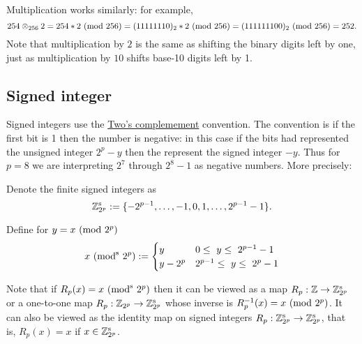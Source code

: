 \begin{example} Multiplication works similarly: for example,
\[
254 \ensuremath{\otimes}_{256} 2 = 254 * 2 \ ({\rm mod}\ 256) = (11111110)_2 * 2  \ ({\rm mod}\ 256)
= (111111100)_2  \ ({\rm mod}\ 256) = 252.
\]
Note that multiplication by $2$ is the same as shifting the binary digits left by one, just as multiplication by $10$ shifts base-10 digits left by 1. \end{example}

\subsection{Signed integer}
Signed integers use the \href{https://epubs.siam.org/doi/abs/10.1137/1.9780898718072.ch3}{Two's complemement} convention. The convention is if the first bit is 1 then the number is negative: in this case if the bits had represented the unsigned integer $2^p - y$ then the represent the signed integer $-y$. Thus for $p = 8$ we are interpreting $2^7$ through $2^8-1$ as negative numbers. More precisely:

\begin{definition} Denote the finite signed integers as
\[
{\mathbb Z}_{2^p}^{\rm s} := \{-2^{p-1} ,\ldots, -1 ,0,1, \ldots, 2^{p-1}-1\}.
\]
\end{definition}

\begin{definition} Define for $y = x\ ({\rm mod}\ 2^p)$
\[
x\ ({\rm mod}^{\rm s}\ 2^p) := \begin{cases} y & 0 \ensuremath{\leq} y \ensuremath{\leq} 2^{p-1}-1 \\
                             y - 2^p & 2^{p-1} \ensuremath{\leq} y \ensuremath{\leq} 2^p - 1
                             \end{cases}
\]
\end{definition}

Note that if $R_p(x) = x\ ({\rm mod}^{\rm s}\ 2^p)$ then it can be viewed as a map $R_p : {\mathbb Z} \rightarrow {\mathbb Z}_{2^p}^{\rm s}$ or a one-to-one map $R_p : {\mathbb Z}_{2^p} \rightarrow {\mathbb Z}_{2^p}^{\rm s}$ whose inverse is $R_p^{-1}(x) = x\ ({\rm mod}\ 2^p)$. It can also be viewed as the identity map on signed integers $R_p : {\mathbb Z}_{2^p}^{\rm s} \rightarrow {\mathbb Z}_{2^p}^{\rm s}$, that is,  $R_p(x) = x$ if $x \in {\mathbb Z}_{2^p}^{\rm s}$.

